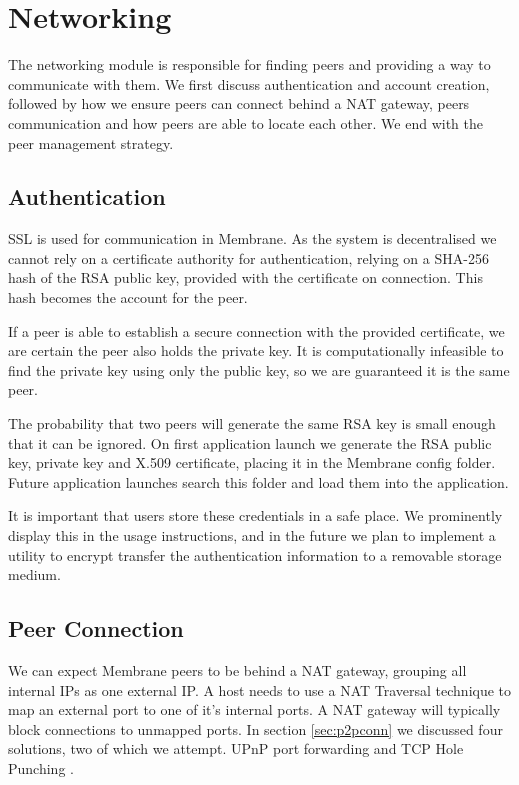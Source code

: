 \documentclass[11pt, a4paper, twoside]{report}
\begin{document}
\section{Networking}

The networking module is responsible for finding peers and providing a way to communicate with them. We first discuss authentication and account creation, followed by how we ensure peers can connect behind a NAT gateway, peers communication and how peers are able to locate each other. We end with the peer management strategy. 

\subsection{Authentication}

SSL is used for communication in Membrane. As the system is decentralised we cannot rely on a certificate authority for authentication, relying on a SHA-256 hash of the RSA public key, provided with the certificate on connection. This hash becomes the account for the peer.

If a peer is able to establish a secure connection with the provided certificate, we are certain the peer also holds the private key. \citep{menezes1996handbook} It is computationally infeasible to find the private key using only the public key, so we are guaranteed it is the same peer.

The probability that two peers will generate the same RSA key is small enough that it can be ignored. On first application launch we generate the RSA public key, private key and X.509 certificate, placing it in the Membrane config folder. Future application launches search this folder and load them into the application.

It is important that users store these credentials in a safe place. We prominently display this in the usage instructions, and in the future we plan to implement a utility to encrypt transfer the authentication information to a removable storage medium.

\subsection{Peer Connection}

We can expect Membrane peers to be behind a NAT gateway, grouping all internal IPs as one external IP. A host needs to use a NAT Traversal technique to map an external port to one of it's internal ports. A NAT gateway will typically block connections to unmapped ports. In section \ref{sec:p2pconn} we discussed four solutions, two of which we attempt. UPnP port forwarding \citep{boucadair2013universal} and TCP Hole Punching \citep{wing2010traversal}.
\end{document}
